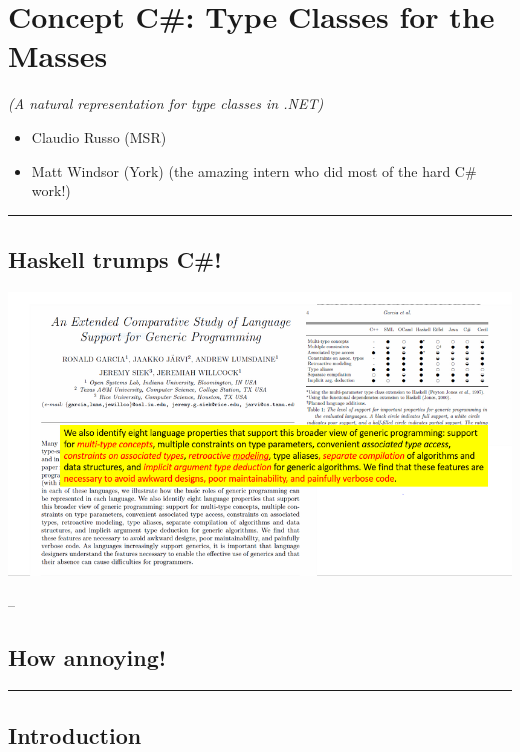 

\section{Concept C\#: Type Classes for the
Masses}\label{concept-c-type-classes-for-the-masses}

\emph{(A natural representation for type classes in .NET)}

\begin{itemize}
\tightlist
\item
  Claudio Russo (MSR)
\item
  Matt Windsor (York) (the amazing intern who did most of the hard C\#
  work!)
\end{itemize}

\begin{center}\rule{0.5\linewidth}{\linethickness}\end{center}

\subsection{Haskell trumps C\#!}\label{haskell-trumps-c}

\includegraphics{./images/comparison.png}

--

\subsection{\texorpdfstring{\textbf{How
annoying!}}{How annoying!}}\label{how-annoying}

\begin{center}\rule{0.5\linewidth}{\linethickness}\end{center}

\subsection{Introduction}\label{introduction}

